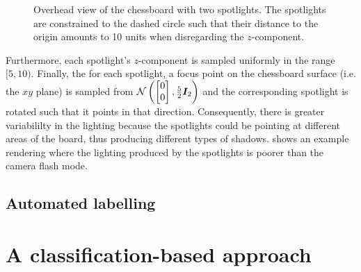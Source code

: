 \documentclass[../main.tex]{subfiles}
\begin{document}
\begin{enumerate}
\begin{figure}
            \caption[Overhead view of the chessboard with two spotlights.]{Overhead view of the chessboard with two spotlights. The spotlights are constrained to the dashed circle such that their distance to the origin amounts to 10 units when disregarding the $z$-component.}
            \label{fig:chessboard_lighting_circle}
        \end{figure}
        Furthermore, each spotlight's $z$-component is sampled uniformly in the range $[5, 10)$.
        Finally, the for each spotlight, a focus point on the chessboard surface (i.e. the $xy$ plane) is sampled from
        \(
            \mathcal{N}\left(
                \begin{bmatrix}
                    0 \\ 0
                \end{bmatrix},
                \frac{5}{2} {\bm{I}}_2
            \right)
        \)
        and the corresponding spotlight is rotated such that it points in that direction.
        Consequently, there is greater variabililty in the lighting because the spotlights could be pointing at different areas of the board, thus producing different types of shadows.
         shows an example rendering where the lighting produced by the spotlights is poorer than the camera flash mode.
\end{enumerate}

\subsection{Automated labelling}

\section{A classification-based approach}
\end{document}
